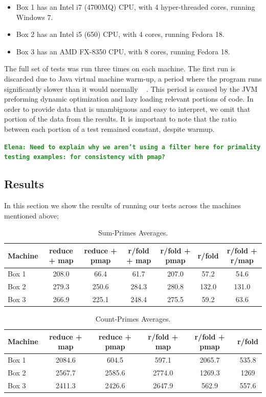 \documentclass[12pt]{article}
\newcommand{\comment}[1]{{\bf \tt  {#1}}}
\newcommand{\emcomment}[1]{\textcolor{ForestGreen}{\comment{Elena: {#1}}}}
\begin{document}
\begin{itemize}
 \item 
 Box 1 has an Intel i7 (4700MQ) CPU, with 4 hyper-threaded cores, running Windows 7.
 \item
 Box 2 has an Intel i5 (650) CPU, with 4 cores, running Fedora 18.
 \item
 Box 3 has an AMD FX-8350 CPU, with 8 cores, running Fedora 18. 
 \end{itemize}
  
The full set of tests was run three times on each machine. The first run is discarded due to Java virtual machine warm-up, a period where the program runs significantly slower than it would normally ~\cite{Blackburn:2008} . This period is caused by the JVM preforming dynamic optimization and lazy loading relevant portions of code. In order to provide data that is unambiguous and easy to interpret, we omit that portion of the data from the results. It is important to note that the ratio between each portion of a test remained constant, despite warmup.

\emcomment{Need to explain why we aren't using a filter here for primality testing examples: for consistency with pmap?}

\subsection{Results}\label{sec:results}
In this section we show the results of running our tests across the machines mentioned above;

\begin{table}[h!]
\begin{center}
\begin{tabular}{|l|c|c|c|c|c|c|}
\hline
Machine & reduce + map & reduce + pmap & r/fold + map & r/fold + pmap & r/fold & r/fold + r/map \\
\hline
Box 1 & 208.0 & 66.4 & 61.7 & 207.0 & 57.2 &  54.6 \\
Box 2 & 279.3 & 250.6 & 284.3 & 280.8 & 132.0 & 131.0 \\
Box 3 & 266.9 & 225.1 & 248.4 & 275.5 & 59.2 & 63.6 \\
\hline
\end{tabular}
\end{center}
\caption{Sum-Primes Averages.}\label{table:sum-primes}
\end{table}

\begin{table}[h!]
\begin{center}
\begin{tabular}{|l|c|c|c|c|c|}
\hline
Machine & reduce + map & reduce + pmap & r/fold + map & r/fold + pmap & r/fold\\
\hline
Box 1 & 2084.6 & 604.5 & 597.1 & 2065.7 & 535.8\\
Box 2 & 2567.7 & 2585.6 & 2774.0 & 1269.3 & 1269 \\
Box 3 & 2411.3 & 2426.6 & 2647.9 & 562.9 & 557.6\\
\hline
\end{tabular}
\end{center}
\caption{Count-Primes Averages.}\label{table:sum-primes}
\end{table}
\end{document}
